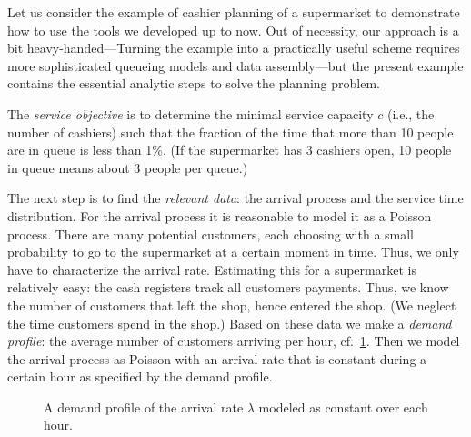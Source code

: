 Let us consider the example of cashier planning of a supermarket to
demonstrate how to use the tools we developed up to now. Out of
necessity, our approach is a bit heavy-handed---Turning the example
into a practically useful scheme requires more sophisticated queueing
models and data assembly---but the present example contains the
essential analytic steps to solve the planning problem.

The \emph{service objective} is to determine the minimal service
capacity $c$ (i.e., the number of cashiers) such that the fraction of the time that more than 
10 people are in queue is less than 1\%. (If the supermarket has 3 cashiers open, 10 people in queue means about 3 people per queue.)

The next step is to find the \emph{relevant data}: the arrival process and the service time distribution. For the arrival process it is reasonable to model it as a Poisson process. There are many potential customers, each choosing with a small probability to go to the supermarket at a certain moment in time. Thus, we only have to characterize the arrival rate. Estimating this for a supermarket is relatively easy: the cash registers track all customers
payments. Thus, we know the number of customers that left the shop,
hence entered the shop. (We neglect the time customers spend in the
shop.) Based on these data we make a \emph{demand profile}: the
average number of customers arriving per hour, cf.~\cref{fig:loadprofile}. Then we model the arrival process as Poisson with an arrival rate that is constant during a certain hour as specified by the demand profile. 

\begin{figure}[t]
 \centering
{}
 \caption{A demand profile of the arrival rate $\lambda$ modeled as constant over each hour.}
 \label{fig:loadprofile}
\end{figure}


